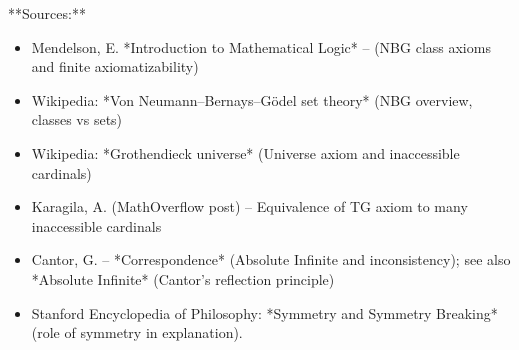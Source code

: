 \documentclass[11pt]{article}
\begin{document}
**Sources:**

\begin{itemize}
  \item Mendelson, E. *Introduction to Mathematical Logic* – (NBG class axioms and finite axiomatizability)
  \item Wikipedia: *Von Neumann–Bernays–Gödel set theory* (NBG overview, classes vs sets)
  \item Wikipedia: *Grothendieck universe* (Universe axiom and inaccessible cardinals)
  \item Karagila, A. (MathOverflow post) – Equivalence of TG axiom to many inaccessible cardinals
  \item Cantor, G. – *Correspondence* (Absolute Infinite and inconsistency); see also *Absolute Infinite* (Cantor’s reflection principle)
  \item Stanford Encyclopedia of Philosophy: *Symmetry and Symmetry Breaking* (role of symmetry in explanation).
\end{itemize}
\end{document}
